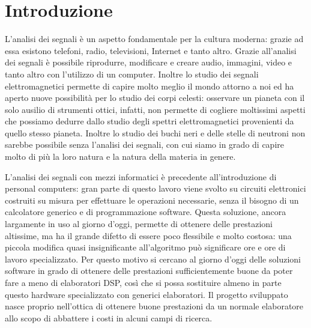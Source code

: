 \chapter*{Introduzione}
\label{intro}

L'analisi dei segnali \`e un aspetto fondamentale per la cultura moderna: grazie
ad essa esistono telefoni, radio, televisioni, Internet e tanto altro. Grazie
all'analisi dei segnali \`e possibile riprodurre, modificare e creare audio,
immagini, video e tanto altro con l'utilizzo di un computer. Inoltre lo studio
dei segnali elettromagnetici permette di capire molto meglio il mondo attorno a
noi ed ha aperto nuove possibilit\`a per lo studio dei corpi celesti: osservare
un pianeta con il solo ausilio di strumenti ottici, infatti, non permette di
cogliere moltissimi aspetti che possiamo dedurre dallo studio degli spettri
elettromagnetici provenienti da quello stesso pianeta. Inoltre lo studio dei
buchi neri e delle stelle di neutroni non sarebbe possibile senza l'analisi dei
segnali, con cui siamo in grado di capire molto di pi\`u la loro natura e la
natura della materia in genere.

L'analisi dei segnali con mezzi informatici \`e precedente all'introduzione di
personal computers: gran parte di questo lavoro viene svolto su circuiti
elettronici costruiti su misura per effettuare le operazioni necessarie, senza
il bisogno di un calcolatore generico e di programmazione software. Questa
soluzione, ancora largamente in uso al giorno d'oggi, permette di ottenere delle
prestazioni altissime, ma ha il grande difetto di essere poco flessibile e molto
costosa: una piccola modifica quasi insignificante all'algoritmo pu\`o
significare ore e ore di lavoro specializzato. Per questo motivo si cercano al
giorno d'oggi delle soluzioni software in grado di ottenere delle prestazioni
sufficientemente buone da poter fare a meno di elaboratori DSP, cos\`i che si
possa sostituire almeno in parte questo hardware specializzato con generici
elaboratori. Il progetto sviluppato nasce proprio nell'ottica di ottenere buone
prestazioni da un normale elaboratore allo scopo di abbattere i costi in alcuni
campi di ricerca.
